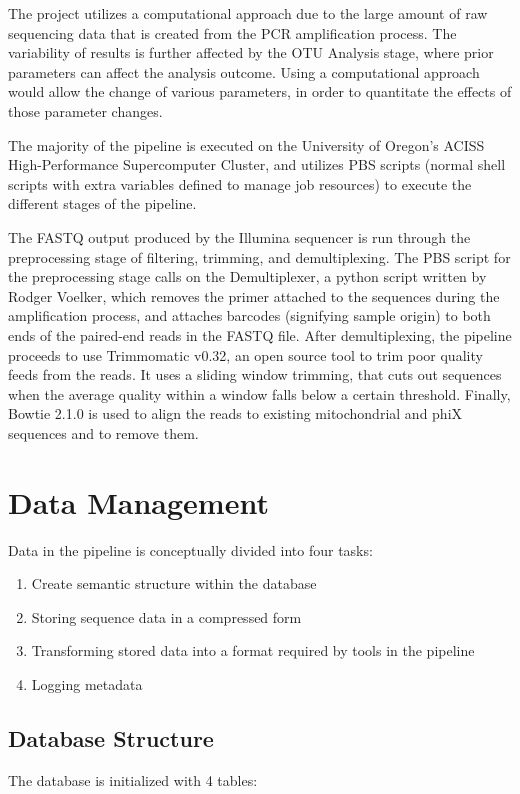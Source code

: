 \documentclass[12pt]{article}
\begin{document}
	The project utilizes a computational approach due to the large amount of raw sequencing data that is created from the PCR amplification process. The variability of results is further affected by the OTU Analysis stage, where prior parameters can affect the analysis outcome. Using a computational approach would allow the change of various parameters, in order to quantitate the effects of those parameter changes.

	The majority of the pipeline is executed on the University of Oregon’s ACISS High-Performance Supercomputer Cluster, and utilizes PBS scripts (normal shell scripts with extra variables defined to manage job resources) to execute the different stages of the pipeline.

	The FASTQ output produced by the Illumina sequencer is run through the preprocessing stage of filtering, trimming, and demultiplexing. The PBS script for the preprocessing stage calls on the Demultiplexer, a python script written by Rodger Voelker, which removes the primer attached to the sequences during the amplification process, and attaches barcodes (signifying sample origin) to both ends of the paired-end reads in the FASTQ file. After demultiplexing, the pipeline proceeds to use Trimmomatic v0.32, an open source tool to trim poor quality feeds from the reads. It uses a sliding window trimming, that cuts out sequences when the average quality within a window falls below a certain threshold. Finally, Bowtie 2.1.0 is used to align the reads to existing mitochondrial and phiX sequences and to remove them.
	
	\section{Data Management} %
	\label{sec:data_management}
	Data in the pipeline is conceptually divided into four tasks:
	
	\begin{enumerate}
		\item Create semantic structure within the database
		\item Storing sequence data in a compressed form
		\item Transforming stored data into a format required by tools in the pipeline
		\item Logging metadata
	\end{enumerate}

	\subsection{Database Structure} %
	\label{sub:database_structure}
	The database is initialized with 4 tables:
	
\end{document}
